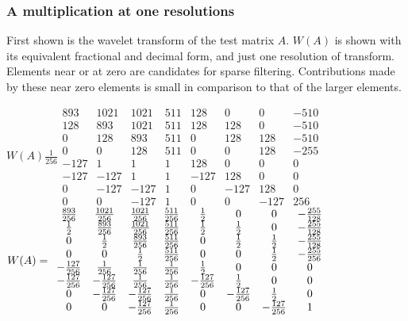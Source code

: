 \documentclass{article}
\begin{document}
\subsubsection {A multiplication at one resolutions}
First shown is the wavelet transform of the test matrix $A$.  $W(A)$ is shown with its equivalent fractional and decimal form, and just one resolution of transform.  Elements near or at zero are candidates for sparse filtering.  Contributions made by these near zero elements is small in comparison to that of the larger elements.  


$W(A) \frac{1}{256} 
\begin{array}{cccccccc}
893 & 1021 & 1021 & 511 & 128 & 0 & 0 & -510 \\ 
128 & 893 & 1021 & 511 & 128 & 128 & 0 & -510 \\ 
0 & 128 & 893 & 511 & 0 & 128 & 128 & -510 \\ 
0 & 0 & 128 & 511 & 0 & 0 & 128 & -255 \\ 
-127 & 1 & 1 & 1 & 128 & 0 & 0 & 0 \\ 
-127 & -127 & 1 & 1 & -127 & 128 & 0 & 0 \\ 
0 & -127 & -127 & 1 & 0 & -127 & 128 & 0 \\ 
0 & 0 & -127 & 1 & 0 & 0 & -127 & 256
\end{array}$\\$ W(A) 
=\allowbreak 
\begin{array}{cccccccc}
\frac{893}{256} & \frac{1021}{256} & \frac{1021}{256} & \frac{511}{256} & 
\frac{1}{2} & 0 & 0 & -\frac{255}{128} \\ 
\frac{1}{2} & \frac{893}{256} & \frac{1021}{256} & \frac{511}{256} & \frac{1%
}{2} & \frac{1}{2} & 0 & -\frac{255}{128} \\ 
0 & \frac{1}{2} & \frac{893}{256} & \frac{511}{256} & 0 & \frac{1}{2} & 
\frac{1}{2} & -\frac{255}{128} \\ 
0 & 0 & \frac{1}{2} & \frac{511}{256} & 0 & 0 & \frac{1}{2} & -\frac{255}{256%
} \\ 
-\frac{127}{256} & \frac{1}{256} & \frac{1}{256} & \frac{1}{256} & \frac{1}{2%
} & 0 & 0 & 0 \\ 
-\frac{127}{256} & -\frac{127}{256} & \frac{1}{256} & \frac{1}{256} & -\frac{%
127}{256} & \frac{1}{2} & 0 & 0 \\ 
0 & -\frac{127}{256} & -\frac{127}{256} & \frac{1}{256} & 0 & -\frac{127}{256%
} & \frac{1}{2} & 0 \\ 
0 & 0 & -\frac{127}{256} & \frac{1}{256} & 0 & 0 & -\frac{127}{256} & 1
\end{array}
\allowbreak $
\end{document}
